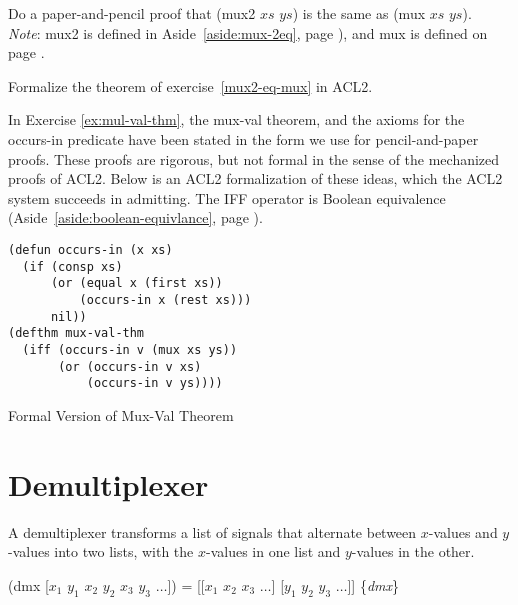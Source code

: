 \begin{ExerciseList}
\Exercise\label{mux2-eq-mux}
Do a paper-and-pencil proof that
(mux2 $xs$ $ys$) is the same as (mux $xs$ $ys$).\\
\emph{Note}: mux2 is defined in
Aside~\ref{aside:mux-2eq}, page \pageref{aside:mux-2eq}),
and mux is defined on page \pageref{mux-defun}.

\Exercise
Formalize the theorem of exercise~\ref{mux2-eq-mux} in ACL2.

\end{ExerciseList}

\begin{aside}
In Exercise \ref{ex:mul-val-thm}, the mux-val theorem,
and the axioms for the occurs-in predicate
have been stated in the form we use for pencil-and-paper proofs.
These proofs are rigorous, but not formal
in the sense of the mechanized proofs of ACL2.
Below is an ACL2 formalization of these ideas,
which the ACL2 system succeeds in admitting.
\label{acl2:iff}
The
IFF
operator is Boolean equivalence
(Aside~\ref{aside:boolean-equivlance}, page \pageref{aside:boolean-equivlance}).

\label{defun:occurs-in}
\begin{Verbatim}
(defun occurs-in (x xs)
  (if (consp xs)
      (or (equal x (first xs))
          (occurs-in x (rest xs)))
      nil))
(defthm mux-val-thm
  (iff (occurs-in v (mux xs ys))
       (or (occurs-in v xs)
           (occurs-in v ys))))
\end{Verbatim}
\label{defthm:mux-val}
\caption{Formal Version of Mux-Val Theorem}
\label{aside:mux-val-thm}
\end{aside}


\section{Demultiplexer}
\label{sec:dmx}

A demultiplexer transforms a list of signals that alternate between
$x$-values and $y$-values into two lists,
with the $x$-values in one list and $y$-values in the other.

\hspace{1cm} (dmx [$x_1$ $y_1$ $x_2$ $y_2$ $x_3$ $y_3$ $\dots$]) =
[[$x_1$ $x_2$ $x_3$ $\dots$] [$y_1$ $y_2$ $y_3$ $\dots$]]
\hfill \{\emph{dmx}\}

